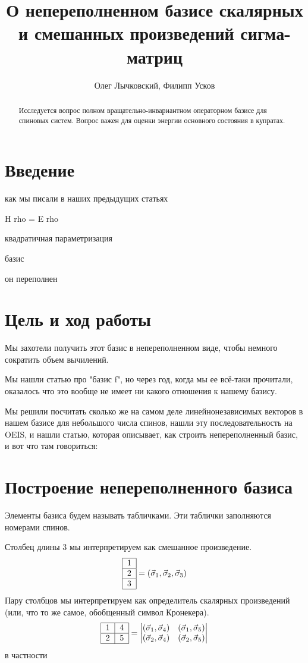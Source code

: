 \documentclass[]{article}
\title{О непереполненном базисе скалярных и смешанных произведений сигма-матриц}
\author{Олег Лычковский, Филипп Усков}
\begin{document}
\maketitle

\begin{abstract}
Исследуется вопрос полном вращательно-инвариантном операторном базисе для спиновых систем.  Вопрос важен для оценки энергии основного состояния в купратах.

\end{abstract}

\section{Введение}
как мы писали в наших предыдущих статьях

H rho = E rho

квадратичная параметризация

базис

он переполнен

\section{Цель и ход работы}
Мы захотели получить этот базис в непереполненном виде, чтобы немного сократить объем вычилений.

Мы нашли статью \cite{basis_f} про "базис f", но через год, когда мы ее всё-таки прочитали, оказалось что это вообще не имеет ни какого отношения к нашему базису.

Мы решили посчитать сколько же на самом деле линейнонезависимых векторов в нашем базисе для небольшого числа спинов,
нашли эту последовательность на OEIS, 
и нашли статью, которая описывает, как строить непереполненный базис, и вот что там говориться:

\section{Построение непереполненного базиса \cite{source_article}}
Элементы базиса будем называть табличками. Эти таблички заполняются номерами спинов.

Столбец длины 3 мы интерпретируем как смешанное произведение.
$$ \begin{tabular}{ | l | }
\hline
1 \\ \hline
2 \\ \hline
3 \\
\hline
\end{tabular} = (\vec \sigma_1, \vec \sigma_2, \vec \sigma_3) $$
Пару столбцов мы интерпретируем как определитель скалярных произведений (или, что то же самое, обобщенный символ Кронекера).
$$ \begin{tabular}{ |l|l| }
\hline
1 & 4 \\ \hline
2 & 5\\ 
\hline
\end{tabular}
 = 
\begin{vmatrix}
(\vec\sigma_1,\vec\sigma_4) & (\vec\sigma_1,\vec\sigma_5)\\
(\vec\sigma_2,\vec\sigma_4) & (\vec\sigma_2,\vec\sigma_5)\\
\end{vmatrix}
$$
в частности
\end{document}
